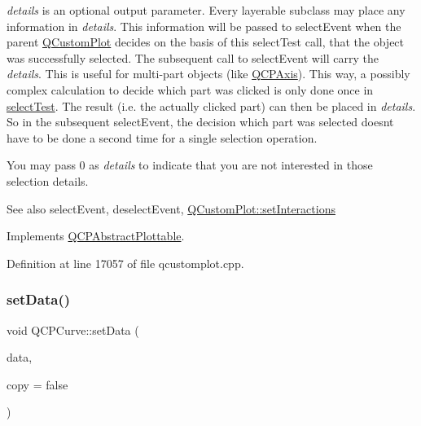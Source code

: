 {\itshape details} is an optional output parameter. Every layerable subclass may place any information in {\itshape details}. This information will be passed to select\+Event when the parent \hyperlink{class_q_custom_plot}{Q\+Custom\+Plot} decides on the basis of this select\+Test call, that the object was successfully selected. The subsequent call to select\+Event will carry the {\itshape details}. This is useful for multi-\/part objects (like \hyperlink{class_q_c_p_axis}{Q\+C\+P\+Axis}). This way, a possibly complex calculation to decide which part was clicked is only done once in \hyperlink{class_q_c_p_curve_a87a9fb34a2a48dcae4c1245ada235e7d}{select\+Test}. The result (i.\+e. the actually clicked part) can then be placed in {\itshape details}. So in the subsequent select\+Event, the decision which part was selected doesn\textquotesingle{}t have to be done a second time for a single selection operation.

You may pass 0 as {\itshape details} to indicate that you are not interested in those selection details.

\begin{DoxySeeAlso}{See also}
select\+Event, deselect\+Event, \hyperlink{class_q_custom_plot_a5ee1e2f6ae27419deca53e75907c27e5}{Q\+Custom\+Plot\+::set\+Interactions} 
\end{DoxySeeAlso}


Implements \hyperlink{class_q_c_p_abstract_plottable_a38efe9641d972992a3d44204bc80ec1d}{Q\+C\+P\+Abstract\+Plottable}.



Definition at line 17057 of file qcustomplot.\+cpp.

\mbox{\label{class_q_c_p_curve_a631ac886708460013b30052f49cbc9da}} 
\subsubsection{\texorpdfstring{set\+Data()}{setData()}\hspace{0.1cm}{\footnotesize\ttfamily [1/3]}}
{\footnotesize\ttfamily void Q\+C\+P\+Curve\+::set\+Data (\begin{DoxyParamCaption}\item[{\hyperlink{qcustomplot_8h_a444d37ec9cb2951b3a7fe443c34d1658}{Q\+C\+P\+Curve\+Data\+Map} $\ast$}]{data,  }\item[{bool}]{copy = {\ttfamily false} }\end{DoxyParamCaption})}

